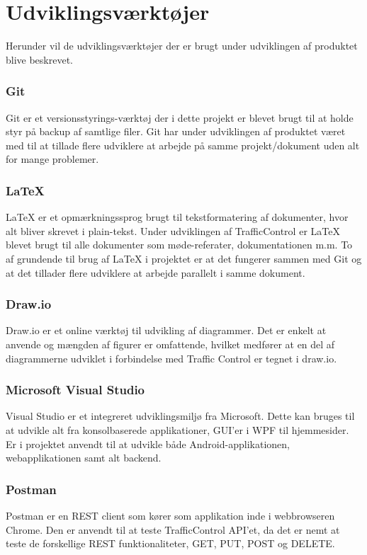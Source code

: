 \chapter{Udviklingsværktøjer}
Herunder vil de udviklingsværktøjer der er brugt under udviklingen af 
produktet blive beskrevet.

\subsection*{Git}
Git\cite{GitRef} er et versionsstyrings-værktøj der i dette projekt er 
blevet brugt til at holde styr på backup af samtlige filer. Git har under 
udviklingen af produktet været med til at tillade flere udviklere at 
arbejde på samme projekt/dokument uden alt for mange problemer.

\subsection*{\LaTeX}
\LaTeX \cite{LatexRef} er et opmærkningssprog brugt til tekstformatering af 
dokumenter, hvor alt bliver skrevet i plain-tekst. Under udviklingen af 
TrafficControl er LaTeX blevet brugt til alle dokumenter som 
møde-referater, dokumentationen m.m. To af grundende til brug af LaTeX i 
projektet er at det fungerer sammen med Git og at det tillader flere 
udviklere at arbejde parallelt i samme dokument.

\subsection*{Draw.io}
Draw.io\cite{Draw.io} er et online værktøj til udvikling af diagrammer. 
Det er enkelt at anvende og mængden af figurer er omfattende, hvilket medfører at en del af diagrammerne udviklet i forbindelse med Traffic Control er tegnet i draw.io.

\subsection*{Microsoft Visual Studio}
Visual Studio\cite{VisualStudio} er et integreret udviklingsmiljø fra 
Microsoft. Dette kan 	bruges til at udvikle alt fra konsolbaserede 
applikationer, GUI'er i WPF til hjemmesider. Er i projektet anvendt til at 
udvikle både Android-applikationen, webapplikationen samt alt backend.

\subsection*{Postman} 
Postman\cite{Postman} er en REST client som kører som applikation inde i 
webbrowseren Chrome. Den er anvendt til at teste TrafficControl API'et, da 
det er nemt at teste de forskellige REST funktionaliteter, GET, PUT, POST og 
DELETE.
